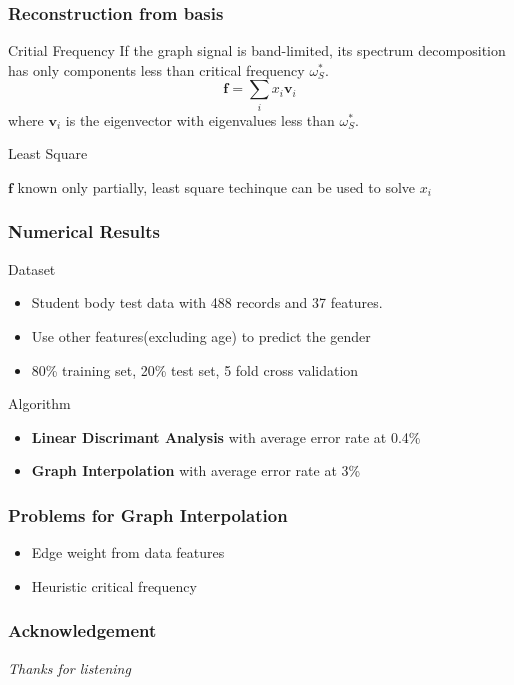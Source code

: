 \documentclass{beamer}
\DeclarePairedDelimiter{\norm}{\lVert}{\rVert}
\begin{document}
\begin{frame}
\frametitle{Reconstruction from basis}
\begin{block}{Critial Frequency}
If the graph signal is band-limited, its spectrum decomposition has only components less than critical frequency $\omega^*_S$.
\begin{equation}
 \bm{f} = \sum_{i}x_i\bm{v}_i
\end{equation}
where $\bm{v}_i$ is the eigenvector with eigenvalues less than $\omega^*_S$.
\end{block}
\begin{block}{Least Square}
\end{block}
$\bm{f}$ known only partially, least square techinque can be used to solve $x_i$

\end{frame}
\begin{frame}
\frametitle{Numerical Results}
\begin{block}{Dataset}
\begin{itemize}
\item Student body test data with 488 records and 37 features.
\item Use other features(excluding age) to predict the gender
\item 80\% training set, 20\% test set, 5 fold cross validation
\end{itemize}
\end{block}
\begin{block}{Algorithm}
\begin{itemize}
\item \textbf{Linear Discrimant Analysis} with average error rate at 0.4\%
\item \textbf{Graph Interpolation} with average error rate at 3\%
\end{itemize}
\end{block}
\end{frame}
\begin{frame}
\frametitle{Problems for Graph Interpolation}
\begin{itemize}
\item Edge weight from data features
\item Heuristic critical frequency
\end{itemize}
\end{frame}
\begin{frame}
\frametitle{Acknowledgement}
\begin{center}
\itshape\Huge Thanks for listening
\end{center}
\end{frame}
\end{document}
